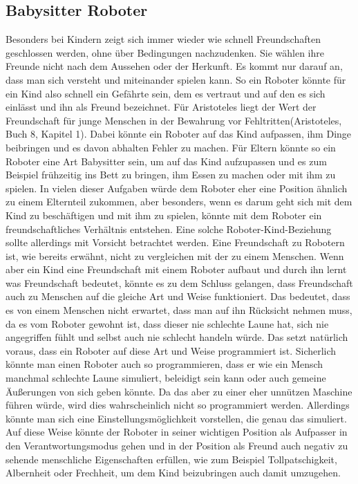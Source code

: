 \documentclass[12pt]{article}
\begin{document}
\subsection{Babysitter Roboter}
Besonders bei Kindern zeigt sich immer wieder wie schnell Freundschaften geschlossen werden, ohne über Bedingungen nachzudenken. Sie wählen ihre Freunde nicht nach dem Aussehen oder der Herkunft. Es kommt nur darauf an, dass man sich versteht und miteinander spielen kann. So ein Roboter könnte für ein Kind also schnell ein Gefährte sein, dem es vertraut und auf den es sich einlässt und ihn als Freund bezeichnet. Für Aristoteles liegt der Wert der Freundschaft für junge Menschen in der \glqq Bewahrung vor Fehltritten\grqq (Aristoteles, Buch 8, Kapitel 1). Dabei könnte ein Roboter auf das Kind aufpassen, ihm Dinge beibringen und es davon abhalten Fehler zu machen. Für Eltern könnte so ein Roboter eine Art Babysitter sein, um auf das Kind aufzupassen und es zum Beispiel frühzeitig ins Bett zu bringen, ihm Essen zu machen oder mit ihm zu spielen. In vielen dieser Aufgaben würde dem Roboter eher eine Position ähnlich zu einem Elternteil zukommen, aber besonders, wenn es darum geht sich mit dem Kind zu beschäftigen und mit ihm zu spielen, könnte mit dem Roboter ein freundschaftliches Verhältnis entstehen. Eine solche Roboter-Kind-Beziehung sollte allerdings mit Vorsicht betrachtet werden. Eine Freundschaft zu Robotern ist,  wie bereits erwähnt, nicht zu vergleichen mit der zu einem Menschen. Wenn aber ein Kind eine Freundschaft mit einem Roboter aufbaut und durch ihn lernt was Freundschaft bedeutet, könnte es zu dem Schluss gelangen, dass Freundschaft auch zu Menschen auf die gleiche Art und Weise funktioniert. Das bedeutet, dass es von einem Menschen nicht erwartet, dass man auf ihn Rücksicht nehmen muss, da es vom Roboter gewohnt ist, dass dieser nie schlechte Laune hat, sich nie angegriffen fühlt und selbst auch nie schlecht handeln würde. Das setzt natürlich voraus, dass ein Roboter auf diese Art und Weise programmiert ist. Sicherlich könnte man einen Roboter auch so programmieren, dass er wie ein Mensch manchmal schlechte Laune simuliert, beleidigt sein kann oder auch gemeine Äußerungen von sich geben könnte. Da das aber zu einer eher unnützen Maschine führen würde, wird dies wahrscheinlich nicht so programmiert werden. Allerdings könnte man sich eine Einstellungsmöglichkeit vorstellen, die genau das simuliert. Auf diese Weise könnte der Roboter in seiner wichtigen Position als Aufpasser in den Verantwortungsmodus gehen und in der Position als Freund auch negativ zu sehende menschliche Eigenschaften erfüllen, wie zum Beispiel Tollpatschigkeit, Albernheit oder Frechheit, um dem Kind beizubringen auch damit umzugehen.\newline
\end{document}
